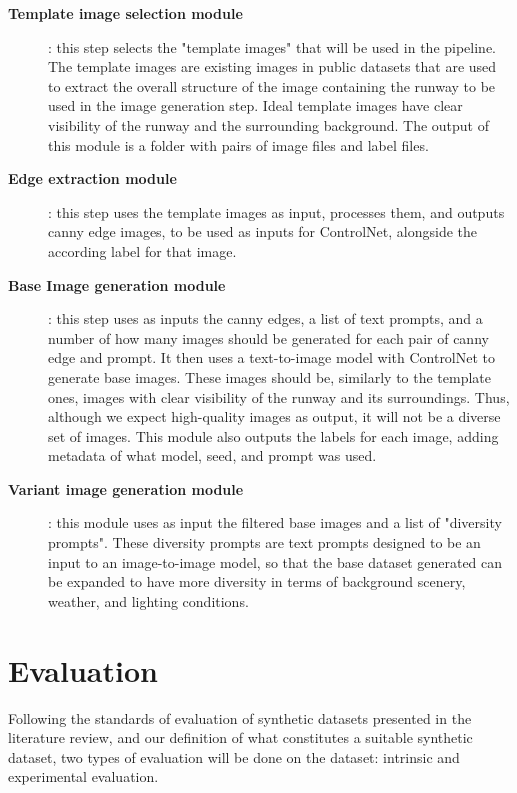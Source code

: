 \begin{description}
    \item[\textbf{Template image selection module}]: this step selects the "template images" that will be used in the pipeline. The template images are existing images in public datasets that are used to extract the overall structure of the image containing the runway to be used in the image generation step. Ideal template images have clear visibility of the runway and the surrounding background.  The output of this module is a folder with pairs of image files and label files.

    \item[\textbf{Edge extraction module}]: this step uses the template images as input, processes them, and outputs canny edge images, to be used as inputs for ControlNet, alongside the according label for that image.

    \item[\textbf{Base Image generation module}]: this step uses as inputs the canny edges, a list of text prompts, and a number of how many images should be generated for each pair of canny edge and prompt. It then uses a text-to-image model with ControlNet to generate base images. These images should be, similarly to the template ones, images with clear visibility of the runway and its surroundings. Thus, although we expect high-quality images as output, it will not be a diverse set of images. This module also outputs the labels for each image, adding metadata of what model, seed, and prompt was used.

    \item[\textbf{Variant image generation module}]: this module uses as input the filtered base images and a list of "diversity prompts". These diversity prompts are text prompts designed to be an input to an image-to-image model, so that the base dataset generated can be expanded to have more diversity in terms of background scenery, weather, and lighting conditions.
\end{description}

\section{Evaluation}

Following the standards of evaluation of synthetic datasets presented in the literature review, and our definition of what constitutes a suitable synthetic dataset, two types of evaluation will be done on the dataset: intrinsic and experimental evaluation.

